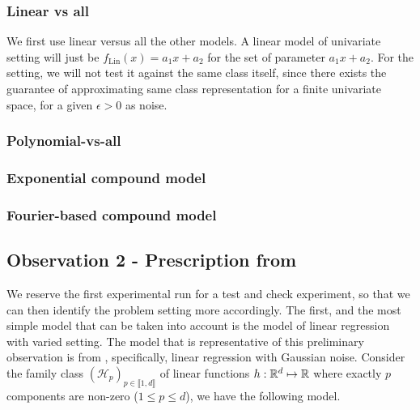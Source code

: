 \documentclass[twoside,10pt]{article}
\begin{document}
\subsubsection{Linear vs all}
We first use linear versus all the other models. A linear model of univariate setting will just be $f_{\mathrm{Lin}}(x)=a_{1}x+a_{2}$ for the set of parameter $a_{1}x+a_{2}$. For the setting, we will not test it against the same class itself, since there exists the guarantee of approximating same class representation for a finite univariate space, for a given $\epsilon > 0$ as noise. 


\subsubsection{Polynomial-vs-all}

\subsubsection{Exponential compound model}

\subsubsection{Fourier-based compound model}

\subsection{Observation 2 - Prescription from \cite{lafon_understanding_2024}}
We reserve the first experimental run for a test and check experiment, so that we can then identify the problem setting more accordingly. The first, and the most simple model that can be taken into account is the model of linear regression with varied setting. The model that is representative of this preliminary observation is from \cite{lafon_understanding_2024}, specifically, linear regression with Gaussian noise. Consider the family class $(\mathcal{H}_p)_{p\in\llbracket1,d\rrbracket}$ of linear functions $h:\mathbb{R}^d\mapsto \mathbb{R}$ where exactly $p$ components are non-zero ($1\leq p\leq d$), we have the following model. 
\end{document}
